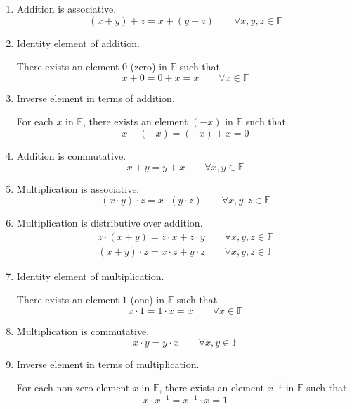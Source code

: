 \begin{enumerate}[label = (\arabic*)]
    \item Addition is associative.
          \[
              (x + y) + z = x + (y + z)\qquad\forall x, y, z\in\mathbb{F}
          \]
    \item Identity element of addition.

          There exists an element $0$ (zero) in $\mathbb{F}$ such that
          \[
              x + 0 = 0 + x = x\qquad\forall x\in\mathbb{F}
          \]
    \item Inverse element in terms of addition.

          For each $x$ in $\mathbb{F}$, there exists an element $(-x)$ in $\mathbb{F}$ such that
          \[
              x + (-x) = (-x) + x = 0
          \]
    \item Addition is commutative.
          \[
              x + y = y + x\qquad\forall x, y\in\mathbb{F}
          \]
    \item Multiplication is associative.
          \[
              (x\cdot y)\cdot z = x\cdot (y\cdot z)\qquad\forall x, y, z\in\mathbb{F}
          \]
    \item Multiplication is distributive over addition.
          \[
              \begin{split}
                  z\cdot (x + y) = z\cdot x + z\cdot y\qquad\forall x, y, z\in\mathbb{F} \\
                  (x + y)\cdot z = x\cdot z + y\cdot z\qquad\forall x, y, z\in\mathbb{F}
              \end{split}
          \]
    \item Identity element of multiplication.

          There exists an element $1$ (one) in $\mathbb{F}$ such that
          \[
              x\cdot 1 = 1\cdot x = x\qquad\forall x\in\mathbb{F}
          \]
    \item Multiplication is commutative.
          \[
              x\cdot y = y\cdot x\qquad\forall x, y\in\mathbb{F}
          \]
    \item Inverse element in terms of multiplication.

          For each non-zero element $x$ in $\mathbb{F}$, there exists an element $x^{-1}$ in $\mathbb{F}$ such that
          \[
              x\cdot x^{-1} = x^{-1}\cdot x = 1
          \]
\end{enumerate}

